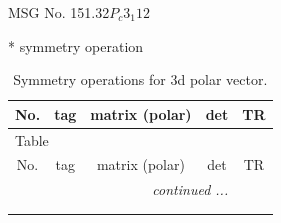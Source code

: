 \documentclass[fleqn,8pt]{jsarticle}
\begin{document}
\setcounter{MaxMatrixCols}{32}

\renewcommand{\tablename}{Table~}
\renewcommand{\figurename}{Figure~}
\begin{center}
\LARGE
MSG No. 151.32\quad$P_{c}3_{1}12$
\end{center}
* symmetry operation
\renewcommand{\arraystretch}{1.3}
\begin{longtable}{ccccc}
\caption{Symmetry operations for 3d polar vector.}
 \\
 \hline \hline
No. & tag & matrix (polar) & det & TR \\ \hline \endfirsthead

\multicolumn{4}{l}{\tablename\ \thetable{}} \\
 \hline \hline
No. & tag & matrix (polar) & det & TR \\ \hline \endhead

 \hline \hline
\multicolumn{4}{r}{\footnotesize\it continued ...} \\ \endfoot

 \hline \hline
\multicolumn{4}{r}{} \\ \endlastfoot


\end{longtable}
\end{document}
